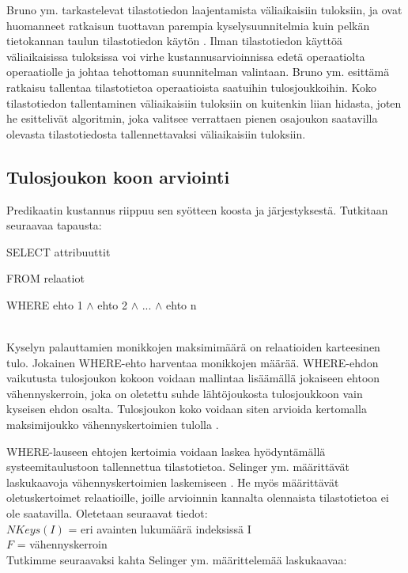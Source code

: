 \documentclass[finnish]{tktltiki2}
\theoremstyle{definition}
\theoremstyle{remark}
\begin{document}
Bruno ym. tarkastelevat tilastotiedon laajentamista väliaikaisiin tuloksiin, ja ovat huomanneet ratkaisun tuottavan parempia kyselysuunnitelmia kuin pelkän tietokannan taulun tilastotiedon käytön \cite{bruno2002exploiting}. Ilman tilastotiedon käyttöä väliaikaisissa tuloksissa voi virhe kustannusarvioinnissa edetä operaatiolta operaatiolle ja johtaa tehottoman suunnitelman valintaan. Bruno ym. esittämä ratkaisu tallentaa tilastotietoa operaatioista saatuihin tulosjoukkoihin. Koko tilastotiedon tallentaminen väliaikaisiin tuloksiin on kuitenkin liian hidasta, joten he esittelivät algoritmin, joka valitsee verrattaen pienen osajoukon saatavilla olevasta tilastotiedosta tallennettavaksi väliaikaisiin tuloksiin.

\subsection{Tulosjoukon koon arviointi}
Predikaatin kustannus riippuu sen syötteen koosta ja järjestyksestä. Tutkitaan seuraavaa tapausta:
\newline

\begin{frame}

SELECT attribuuttit

FROM relaatiot

WHERE ehto 1 $\wedge$ ehto 2 $\wedge$ ... $\wedge$ ehto n
\end{frame}
\\\newline
Kyselyn palauttamien monikkojen maksimimäärä on relaatioiden karteesinen tulo. Jokainen WHERE-ehto harventaa monikkojen määrää. WHERE-ehdon vaikutusta tulosjoukon kokoon voidaan mallintaa lisäämällä jokaiseen ehtoon vähennyskerroin, joka on oletettu suhde lähtöjoukosta tulosjoukkoon vain kyseisen ehdon osalta. 
Tulosjoukon koko voidaan siten arvioida kertomalla maksimijoukko vähennyskertoimien tulolla \cite{ramakrishnan2003database}. 

WHERE-lauseen ehtojen kertoimia voidaan laskea hyödyntämällä systeemitaulustoon tallennettua tilastotietoa. Selinger ym. määrittävät laskukaavoja vähennyskertoimien laskemiseen \cite{selinger1979access}. He myös määrittävät oletuskertoimet relaatioille, joille arvioinnin kannalta olennaista tilastotietoa ei ole saatavilla. Oletetaan seuraavat tiedot:
\\\newline
$NKeys(I)$ = eri avainten lukumäärä indeksissä I
\\
$F$ = vähennyskerroin
\\\newline
Tutkimme seuraavaksi kahta Selinger ym. määrittelemää laskukaavaa:
\end{document}
